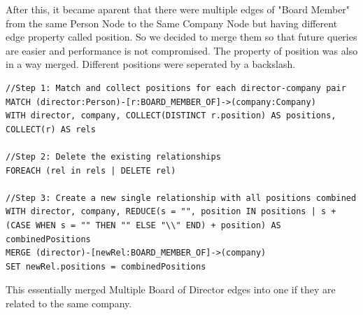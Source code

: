 \documentclass[12pt]{article}
\begin{document}
After this, it became aparent that there were multiple edges of "Board Member" from the same Person Node to the Same Company Node but having different edge property called position. So we decided to merge them so that future queries are easier and performance is not compromised.  The property of position was also in a way merged. Different positions were seperated by a backslash.
\begin{lstlisting}[frame=single]
//Step 1: Match and collect positions for each director-company pair
MATCH (director:Person)-[r:BOARD_MEMBER_OF]->(company:Company)
WITH director, company, COLLECT(DISTINCT r.position) AS positions, COLLECT(r) AS rels

//Step 2: Delete the existing relationships
FOREACH (rel in rels | DELETE rel)

//Step 3: Create a new single relationship with all positions combined
WITH director, company, REDUCE(s = "", position IN positions | s + (CASE WHEN s = "" THEN "" ELSE "\\" END) + position) AS combinedPositions
MERGE (director)-[newRel:BOARD_MEMBER_OF]->(company)
SET newRel.positions = combinedPositions
\end{lstlisting}
This essentially merged Multiple Board of Director edges into one if they are related to the same company.
\end{document}
